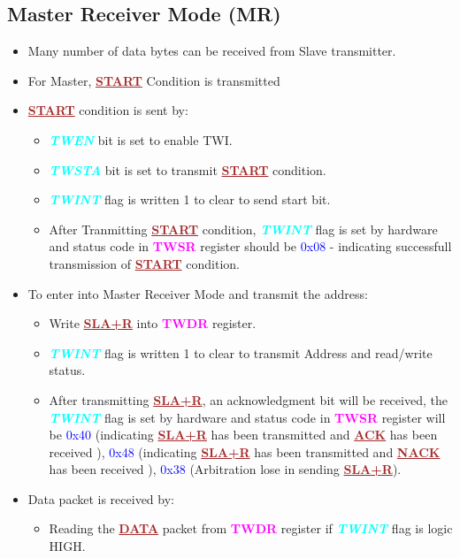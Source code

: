 \documentclass{article}
\newcommand{\bitFormat}[1]{\emph{\textbf{\textcolor{cyan}{#1}}}}
\newcommand{\regFormat}[1]{\textbf{\textcolor{magenta}{#1}}}
\newcommand{\iicFormat}[1]{\textbf{\textcolor{brown}{\underline{#1}}}}
\newcommand{\statusCode}[1]{{\textcolor{blue}{{ \LARGE #1}}}}
\begin{document}
\subsection{Master Receiver Mode (MR)}
\begin{itemize}
    \item Many number of data bytes can be received from Slave transmitter.
    \item For Master, \iicFormat{START} Condition is transmitted
    \item \iicFormat{START} condition is sent by:
    \begin{itemize}
        \item \bitFormat{TWEN} bit is set to enable TWI.
        \item \bitFormat{TWSTA} bit is set to transmit \iicFormat{START} condition.
        \item \bitFormat{TWINT} flag is written 1 to clear to send start bit.
        \item After Tranmitting \iicFormat{START} condition, \bitFormat{TWINT} flag is set by hardware and status code in \regFormat{TWSR} register should be \statusCode{0x08} - indicating successfull transmission of \iicFormat{START} condition.
    \end{itemize}
    \item  To enter into Master Receiver Mode and transmit the address:
    \begin{itemize}
        \item Write \iicFormat{SLA+R} into \regFormat{TWDR} register.
        \item \bitFormat{TWINT} flag is written 1 to clear to transmit Address and read/write status.
        \item After transmitting \iicFormat{SLA+R}, an acknowledgment bit will be received, the \bitFormat{TWINT} flag is set by hardware and status code in \regFormat{TWSR} register will be \statusCode{0x40} (indicating \iicFormat{SLA+R} has been transmitted and \iicFormat{ACK} has been received ), \statusCode{0x48} (indicating \iicFormat{SLA+R} has been transmitted and \iicFormat{NACK} has been received ), \statusCode{0x38} (Arbitration lose in sending \iicFormat{SLA+R}).
    \end{itemize}
    \item Data packet is received by:
    \begin{itemize}
        \item Reading the \iicFormat{DATA} packet from \regFormat{TWDR} register if \bitFormat{TWINT} flag is logic HIGH.

\end{itemize}
\end{itemize}
\end{document}
